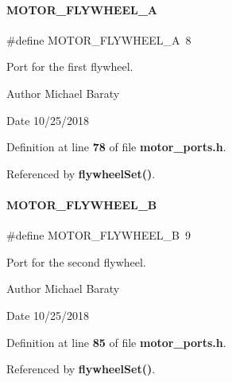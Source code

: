 \paragraph{M\+O\+T\+O\+R\+\_\+\+F\+L\+Y\+W\+H\+E\+E\+L\+\_\+A}
{\footnotesize\ttfamily \#define M\+O\+T\+O\+R\+\_\+\+F\+L\+Y\+W\+H\+E\+E\+L\+\_\+A~8}



Port for the first flywheel. 

\begin{DoxyAuthor}{Author}
Michael Baraty 
\end{DoxyAuthor}
\begin{DoxyDate}{Date}
10/25/2018 
\end{DoxyDate}


Definition at line \textbf{ 78} of file \textbf{ motor\+\_\+ports.\+h}.



Referenced by \textbf{ flywheel\+Set()}.

\mbox{\label{motor__ports_8h_afb09e0b75a1fa01301813b19ab267914}} 
\paragraph{M\+O\+T\+O\+R\+\_\+\+F\+L\+Y\+W\+H\+E\+E\+L\+\_\+B}
{\footnotesize\ttfamily \#define M\+O\+T\+O\+R\+\_\+\+F\+L\+Y\+W\+H\+E\+E\+L\+\_\+B~9}



Port for the second flywheel. 

\begin{DoxyAuthor}{Author}
Michael Baraty 
\end{DoxyAuthor}
\begin{DoxyDate}{Date}
10/25/2018 
\end{DoxyDate}


Definition at line \textbf{ 85} of file \textbf{ motor\+\_\+ports.\+h}.



Referenced by \textbf{ flywheel\+Set()}.

\mbox{\label{motor__ports_8h_a743b47e164fb23b30f4f2f228db0b338}} 
